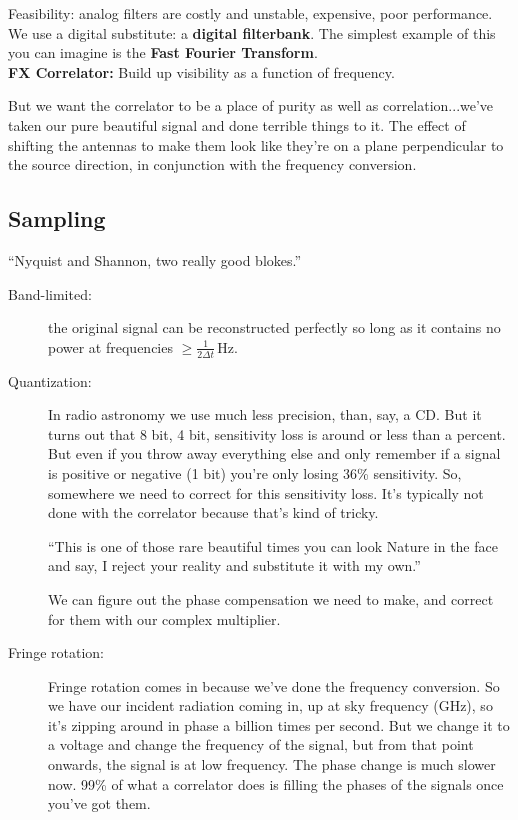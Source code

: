 \documentclass[a4paper]{article}
\begin{document}
Feasibility: analog filters are costly and unstable, expensive, poor performance. We use a digital substitute: a \textbf{digital filterbank}. The simplest example of this you can imagine is the \textbf{Fast Fourier Transform}. \\

\textbf{FX Correlator:} Build up visibility as a function of frequency.

But we want the correlator to be a place of purity as well as correlation...we've taken our pure beautiful signal and done terrible things to it. The effect of shifting the antennas to make them look like they're on a plane perpendicular to the source direction, in conjunction with the frequency conversion. 

\subsection{Sampling}

``Nyquist and Shannon, two really good blokes.'' 

\begin{description}

\item[Band-limited:] the original signal can be reconstructed perfectly so long as it contains no power at frequencies $\geq \frac{1}{2 \Delta t}$\,Hz. 

\item[Quantization:] In radio astronomy we use much less precision, than, say, a CD. But it turns out that 8 bit, 4 bit, sensitivity loss is around or less than a percent. But even if you throw away everything else and only remember if a signal is positive or negative (1 bit) you're only losing 36\% sensitivity. So, somewhere we need to correct for this sensitivity loss. It's typically not done with the correlator because that's kind of tricky. 

``This is one of those rare beautiful times you can look Nature in the face and say, I reject your reality and substitute it with my own.''

We can figure out the phase compensation we need to make, and correct for them with our complex multiplier. 

\item[Fringe rotation:] Fringe rotation comes in because we've done the frequency conversion. So we have our incident radiation coming in, up at sky frequency (GHz), so it's zipping around in phase a billion times per second. But we change it to a voltage and change the frequency of the signal, but from that point onwards, the signal is at low frequency. The phase change is much slower now. 99\% of what a correlator does is filling the phases of the signals once you've got them. 

\end{description}
\end{document}

